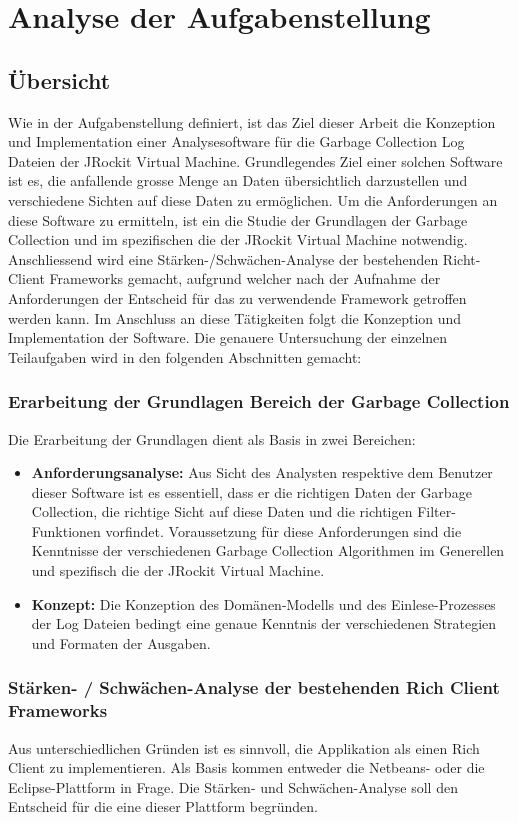 \chapter{Analyse der Aufgabenstellung}
\section{Übersicht}
Wie in der Aufgabenstellung definiert, ist das Ziel dieser Arbeit die Konzeption und Implementation einer Analysesoftware für die Garbage Collection Log Dateien der JRockit Virtual Machine. Grundlegendes Ziel einer solchen Software ist es, die anfallende grosse Menge an Daten übersichtlich darzustellen und verschiedene Sichten auf diese Daten zu ermöglichen. Um die Anforderungen an diese Software zu ermitteln, ist ein die Studie der Grundlagen der Garbage Collection und im spezifischen die der JRockit Virtual Machine notwendig. Anschliessend wird eine Stärken-/Schwächen-Analyse der bestehenden Richt-Client Frameworks gemacht, aufgrund welcher nach der Aufnahme der Anforderungen der Entscheid für das zu verwendende Framework getroffen werden kann. Im Anschluss an diese Tätigkeiten folgt die Konzeption und Implementation der Software. Die genauere Untersuchung der einzelnen Teilaufgaben wird in den folgenden Abschnitten gemacht:

\subsection{Erarbeitung der Grundlagen Bereich der Garbage Collection}
Die Erarbeitung der Grundlagen dient als Basis in zwei Bereichen:
\begin{itemize}
	\item \textbf{Anforderungsanalyse:} Aus Sicht des Analysten respektive dem Benutzer dieser Software ist es essentiell, dass er die richtigen Daten der Garbage Collection, die richtige Sicht auf diese Daten und die richtigen Filter-Funktionen vorfindet. Voraussetzung für diese Anforderungen sind die Kenntnisse der verschiedenen Garbage Collection Algorithmen im Generellen und spezifisch die der JRockit Virtual Machine. 
	\item \textbf{Konzept: } Die Konzeption des Domänen-Modells und des Einlese-Prozesses der Log Dateien bedingt eine genaue Kenntnis der verschiedenen Strategien und Formaten der Ausgaben.
\end{itemize}

\subsection{Stärken- / Schwächen-Analyse der bestehenden Rich Client Frameworks}
Aus unterschiedlichen Gründen ist es sinnvoll, die Applikation als einen Rich Client zu implementieren. Als Basis kommen entweder die Netbeans- oder die Eclipse-Plattform in Frage. Die Stärken- und Schwächen-Analyse soll den Entscheid für die eine dieser Plattform begründen.


